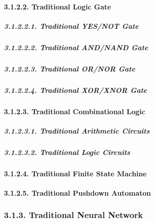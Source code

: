 \documentclass[
]{article}
\begin{document}
\hypertarget{traditional-logic-gate-1}{%
\paragraph{3.1.2.2. Traditional Logic
Gate}\label{traditional-logic-gate-1}}

\hypertarget{traditional-yesnot-gate-1}{%
\subparagraph{3.1.2.2.1. Traditional YES/NOT
Gate}\label{traditional-yesnot-gate-1}}

\hypertarget{traditional-andnand-gate-1}{%
\subparagraph{3.1.2.2.2. Traditional AND/NAND
Gate}\label{traditional-andnand-gate-1}}

\hypertarget{traditional-ornor-gate-1}{%
\subparagraph{3.1.2.2.3. Traditional OR/NOR
Gate}\label{traditional-ornor-gate-1}}

\hypertarget{traditional-xorxnor-gate-1}{%
\subparagraph{3.1.2.2.4. Traditional XOR/XNOR
Gate}\label{traditional-xorxnor-gate-1}}

\hypertarget{traditional-combinational-logic-1}{%
\paragraph{3.1.2.3. Traditional Combinational
Logic}\label{traditional-combinational-logic-1}}

\hypertarget{traditional-arithmetic-circuits-1}{%
\subparagraph{3.1.2.3.1. Traditional Arithmetic
Circuits}\label{traditional-arithmetic-circuits-1}}

\hypertarget{traditional-logic-circuits-1}{%
\subparagraph{3.1.2.3.2. Traditional Logic
Circuits}\label{traditional-logic-circuits-1}}

\hypertarget{traditional-finite-state-machine-1}{%
\paragraph{3.1.2.4. Traditional Finite State
Machine}\label{traditional-finite-state-machine-1}}

\hypertarget{traditional-pushdown-automaton-1}{%
\paragraph{3.1.2.5. Traditional Pushdown
Automaton}\label{traditional-pushdown-automaton-1}}

\hypertarget{traditional-neural-network-1}{%
\subsubsection{3.1.3. Traditional Neural
Network}\label{traditional-neural-network-1}}
\end{document}
